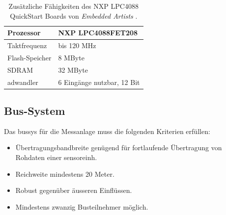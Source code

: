 \begin{table}
\begin{center}
\begin{tabular}{|l|l|}
\hline
Prozessor & NXP LPC4088FET208\\
\hline
Taktfrequenz & bis 120 MHz \\
\hline
Flash-Speicher & 8 MByte \\
\hline
SDRAM & 32 MByte \\
\hline
\gls{adwandler} & 6 Eingänge nutzbar, 12 Bit \\
\hline
\end{tabular}
\caption{Zusätzliche Fähigkeiten des NXP LPC4088 QuickStart Boards von \emph{Embedded Artists}  \cite{nxplpc4088qsb}.}
\label{table.nxplpc4088qsb}
\end{center}
\end{table}

\subsection{Bus-System}
Das \gls{bussys} für die Messanlage muss die folgenden Kriterien erfüllen:
\begin{itemize}
\item Übertragungsbandbreite genügend für fortlaufende Übertragung von Rohdaten einer \gls{sensoreinh}.
\item Reichweite mindestens 20 Meter.
\item Robust gegenüber äusseren Einflüssen.
\item Mindestens zwanzig Busteilnehmer möglich.
\end{itemize}

